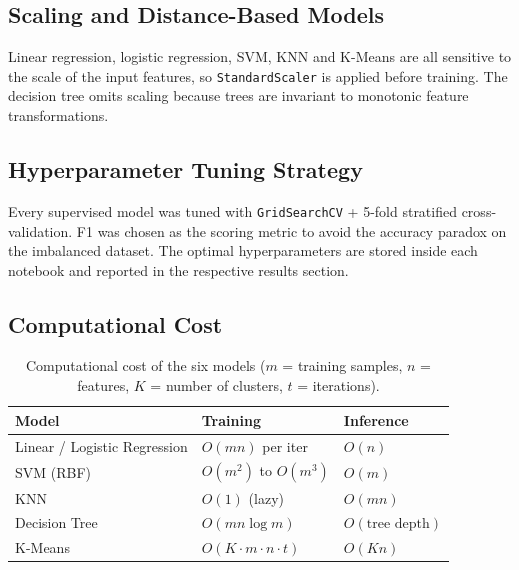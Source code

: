 \documentclass[11pt,a4paper]{article}
\begin{document}
\subsection{Scaling and Distance-Based Models}
Linear regression, logistic regression, SVM, KNN and K-Means are all
sensitive to the scale of the input features, so \texttt{StandardScaler}
is applied before training. The decision tree omits scaling because trees
are invariant to monotonic feature transformations.

\subsection{Hyperparameter Tuning Strategy}
Every supervised model was tuned with \texttt{GridSearchCV} + 5-fold
stratified cross-validation. F1 was chosen as the scoring metric to avoid
the accuracy paradox on the imbalanced dataset. The optimal
hyperparameters are stored inside each notebook and reported in the
respective results section.

\subsection{Computational Cost}

\begin{table}[H]
    \centering
    \begin{tabular}{lll}
        \toprule
        \textbf{Model} & \textbf{Training} & \textbf{Inference} \\
        \midrule
        Linear / Logistic Regression  & $O(mn)$ per iter     & $O(n)$ \\
        SVM (RBF)                     & $O(m^{2})$ to $O(m^{3})$ & $O(m)$ \\
        KNN                           & $O(1)$ (lazy)         & $O(mn)$ \\
        Decision Tree                 & $O(mn \log m)$        & $O(\text{tree depth})$ \\
        K-Means                       & $O(K \cdot m \cdot n \cdot t)$ & $O(Kn)$ \\
        \bottomrule
    \end{tabular}
    \caption{Computational cost of the six models ($m$ = training samples,
    $n$ = features, $K$ = number of clusters, $t$ = iterations).}
    \label{tab:cost}
\end{table}

\newpage
\end{document}
